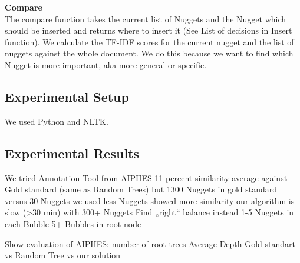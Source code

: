 \textbf{Compare}\\

The compare function takes the current list of Nuggets and the Nugget which should be inserted and returns where to insert it (See List of decisions in Insert function). We calculate the TF-IDF scores for the current nugget and the list of nuggets against the whole document. We do this because we want to find which Nugget is more important, aka more general or specific.


\subsection{Experimental Setup}

We used Python and NLTK.

\subsection{Experimental Results}

We tried Annotation Tool from AIPHES
11 percent similarity average against Gold standard (same as Random Trees)
but
1300 Nuggets in gold standard versus 30 Nuggets we used
less Nuggets showed more similarity
our algorithm is slow (>30 min) with 300+ Nuggets
Find „right“ balance instead
1-5 Nuggets in each Bubble
5+ Bubbles in root node

Show evaluation of AIPHES:
	number of root trees
	Average Depth
	Gold standart vs Random Tree vs our solution

